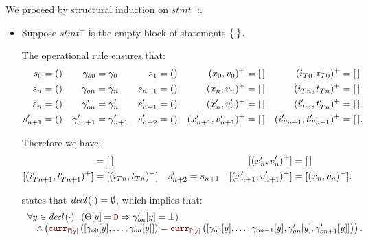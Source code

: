 \begin{skippableproof}
    We proceed by structural induction on $stmt^+$:.
    \begin{itemize}
        \item Suppose $stmt^+$ is the empty block of statements $\{\cdot\}$.

              The operational rule  ensures that:
              \begin{align*}
                  s_0      & = () & \gamma_{o0}    & = \gamma_0      & s_1      & = () & (x_0, v_0)^+           & = [\,] & (i_{T0}, t_{T0})^+       & = [\,]  \\
                  s_n      & = () & \gamma_{on}    & = \gamma_n      & s_{n+1}  & = () & (x_n, v_n)^+           & = [\,] & (i_{Tn}, t_{Tn})^+       & = [\,]  \\
                  s_n      & = () & \gamma'_{on}   & = \gamma'_n     & s'_{n+1} & = () & (x'_n, v'_n)^+         & = [\,] & (i'_{Tn}, t'_{Tn})^+     & = [\,]  \\
                  s'_{n+1} & = () & \gamma'_{on+1} & = \gamma'_{n+1} & s'_{n+2} & = () & (x'_{n+1}, v'_{n+1})^+ & = [\,] & (i'_{Tn+1}, t'_{Tn+1})^+ & = [\,].
              \end{align*}

              Therefore we have:
              \begin{align*}
                  [(i'_{Tn}, t'_{Tn})^+]     & = \emptylist           &
                                             &                        &
                  [(x'_n, v'_n)^+]           & = \emptylist             \\
                  [(i'_{Tn+1}, t'_{Tn+1})^+] & = [(i_{Tn}, t_{Tn})^+] &
                  s'_{n+2}                   & = s_{n+1}              &
                  [(x'_{n+1}, v'_{n+1})^+]   & = [(x_n, v_n)^+].
              \end{align*}

               states that
              ${\textit{decl}\left(\cdot\right)} = \emptyset$, which implies that:
              \begin{equation*}
                  \begin{array}{l}
                      \forall y \in \declSet{\skp}, \; \left(\Theta[y] = \dType \Rightarrow \gamma'_{on}[y] = \bot\right) \\
                      \quad \wedge \left(\CurrVal{\tyCtx[y]}{[\gamma_{o0}[y], \dots, \gamma_{on}[y]]} = \CurrVal{\tyCtx[y]}{[\gamma_{o0}[y], \dots, \gamma_{on-1}[y], \gamma'_{on}[y], \gamma'_{on+1}[y]]}\right).
                  \end{array}
              \end{equation*}


\end{itemize}
\end{skippableproof}
